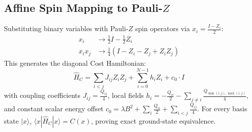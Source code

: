 \subsection{Affine Spin Mapping to Pauli-$Z$}
Substituting binary variables with Pauli-$Z$ spin operators via $x_i = \frac{I - Z_i}{2}$:
\begin{align}
x_i &\to \frac{1}{2}I - \frac{1}{2}Z_i \\
x_i x_j &\to \frac{1}{4}(I - Z_i - Z_j + Z_i Z_j)
\end{align}
This generates the diagonal Cost Hamiltonian:
\begin{equation}
\hat{H}_C = \sum_{i < j} J_{ij} Z_i Z_j + \sum_{i=0}^{N-1} h_i Z_i + c_0 \cdot I
\end{equation}
with coupling coefficients $J_{ij} = \frac{Q_{ij}}{4}$, local fields $h_i = -\frac{Q_{ii}}{2} - \sum_{j \neq i} \frac{Q_{\min(i,j),\max(i,j)}}{4}$, and constant scalar energy offset $c_0 = \lambda B^2 + \sum_i \frac{Q_{ii}}{2} + \sum_{i < j} \frac{Q_{ij}}{4}$.
For every basis state $|x\rangle$, $\langle x | \hat{H}_C | x \rangle = C(x)$, proving exact ground-state equivalence.
